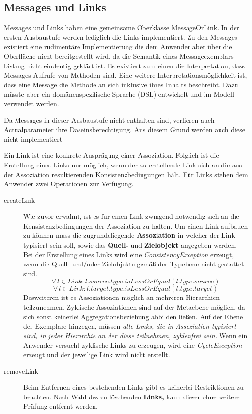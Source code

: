 \subsection{Messages und Links}\label{Message:Message}

Messages und Links haben eine gemeinsame Oberklasse MessageOrLink. In der ersten Ausbaustufe werden lediglich die Links implementiert. Zu den Messages existiert eine rudimentäre
Implementierung die dem Anwender aber über die Oberfläche nicht bereitgestellt wird, da die 
Semantik eines Messageexemplars bislang nicht eindeutig geklärt ist.
Es existiert zum einen die Interpretation, dass Messages Aufrufe von Methoden sind. Eine weitere Interpretationsmöglichkeit ist, dass eine Message die Methode an sich inklusive ihres Inhalts beschreibt. 
Dazu müsste aber ein domänenspezifische Sprache (DSL) entwickelt und im Modell verwendet werden.


Da Messages in dieser Ausbaustufe nicht enthalten sind, verlieren auch Actualparameter ihre Daseinsberechtigung. Aus diesem Grund werden auch diese nicht implementiert.

Ein Link ist eine konkrete Ausprägung einer Assoziation. Folglich ist die Erstellung eines Links nur möglich, wenn der zu erstellende Link sich an die aus der Assoziation resultierenden Konsistenzbedingungen hält. Für Links stehen dem Anwender zwei Operationen zur Verfügung.

\begin{description}
\item[createLink]
Wie zuvor erwähnt, ist es für einen Link zwingend notwendig sich an die Konsistenzbedingungen der Assoziation zu halten. Um einen Link aufbauen zu können muss die zugrundeliegende  \textbf{Assoziation} in welcher der Link typisiert sein soll, sowie das \textbf{Quell-} und \textbf{Zielobjekt} angegeben werden.
Bei der Erstellung eines Links wird eine \emph{ConsistencyException} erzeugt, wenn die Quell- und/oder Zielobjekte gemäß der Typebene nicht 
gestattet sind.
\begin{equation} \forall \, l \in Link: l.source.type.isLessOrEqual(l.type.source)
\end{equation} 
\begin{equation} \forall \, l \in Link: l.target.type.isLessOrEqual(l.type.target)
\end{equation}
Desweiteren ist es Assoziationen möglich an mehreren Hierarchien teilzunehmen. Zyklische Assoziationen sind auf der Metaebene möglich, 
da sich sonst keinerlei Aggregationsbeziehung abbilden ließen.
Auf der Ebene der Exemplare hingegen, müssen \emph{alle Links, die in Assoziation typisiert sind, in jeder Hierarchie an der diese teilnehmen, zyklenfrei sein.}
Wenn ein Anwender versucht zyklische Links zu erzeugen, wird eine \emph{CycleException} erzeugt und der jeweilige Link wird nicht erstellt.
\item[removeLink]
Beim Entfernen eines bestehenden Links gibt es keinerlei Restriktionen zu beachten. Nach Wahl des zu löschenden \textbf{Links,} kann dieser ohne weitere Prüfung entfernt werden.
\end{description}